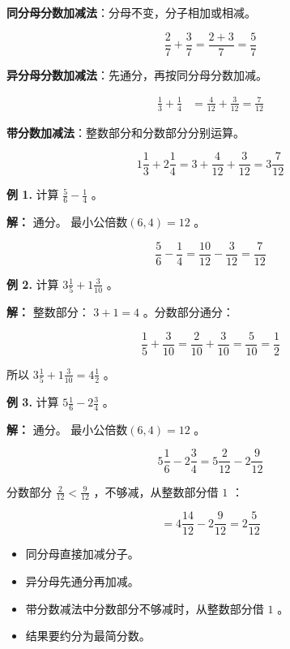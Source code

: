 \begin{understand}


\textbf{同分母分数加减法}：分母不变，分子相加或相减。

\[
\frac{2}{7} + \frac{3}{7} = \frac{2 + 3}{7} = \frac{5}{7}
\]


\textbf{异分母分数加减法}：先通分，再按同分母分数加减。

\[
\begin{aligned}
\frac{1}{3} + \frac{1}{4} &= \frac{4}{12} + \frac{3}{12} = \frac{7}{12}
\end{aligned}
\]


\textbf{带分数加减法}：整数部分和分数部分分别运算。

\[
1\frac{1}{3} + 2\frac{1}{4} = 3 + \frac{4}{12} + \frac{3}{12} = 3\frac{7}{12}
\]


\end{understand}

\begin{workedexamples}


\textbf{例 1.} 计算 $\frac{5}{6} - \frac{1}{4}$ 。

\textbf{解：} 通分。 $\text{最小公倍数}(6, 4) = 12$ 。

\[
\frac{5}{6} - \frac{1}{4} = \frac{10}{12} - \frac{3}{12} = \frac{7}{12}
\]


\textbf{例 2.} 计算 $3\frac{1}{5} + 1\frac{3}{10}$ 。

\textbf{解：} 整数部分： $3 + 1 = 4$ 。分数部分通分：

\[
\frac{1}{5} + \frac{3}{10} = \frac{2}{10} + \frac{3}{10} = \frac{5}{10} = \frac{1}{2}
\]


所以 $3\frac{1}{5} + 1\frac{3}{10} = 4\frac{1}{2}$ 。

\textbf{例 3.} 计算 $5\frac{1}{6} - 2\frac{3}{4}$ 。

\textbf{解：} 通分。 $\text{最小公倍数}(6, 4) = 12$ 。

\[
5\frac{1}{6} - 2\frac{3}{4} = 5\frac{2}{12} - 2\frac{9}{12}
\]


分数部分 $\frac{2}{12} < \frac{9}{12}$ ，不够减，从整数部分借 $1$ ：

\[
= 4\frac{14}{12} - 2\frac{9}{12} = 2\frac{5}{12}
\]


\end{workedexamples}

\begin{keytakeaway}


\begin{itemize}
  \item 同分母直接加减分子。
  \item 异分母先通分再加减。
  \item 带分数减法中分数部分不够减时，从整数部分借 $1$ 。
  \item 结果要约分为最简分数。
\end{itemize}


\end{keytakeaway}

